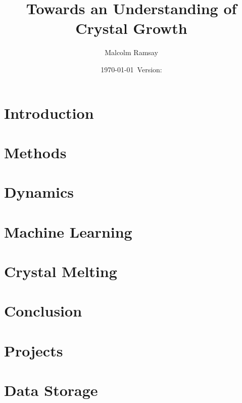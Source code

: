 \documentclass[12pt, a4paper]{report}
\title{Towards an Understanding of Crystal Growth}
\author{Malcolm Ramsay}
\date{\today{}~Version: \version}
\begin{document}
\beforepreface{}
\afterpreface{}

\chapter{Introduction} \label{Introduction}







\chapter{Methods} \label{Methods}






\chapter{Dynamics} \label{Dynamics}




\chapter{Machine Learning} \label{Machine_Learning}




\chapter{Crystal Melting} \label{Crystal_Melting}




\chapter{Conclusion}

\printbibliography{}

\begin{appendices}
  \chapter{Projects}
  

  \chapter{Data Storage}
  

\end{appendices}
\end{document}
